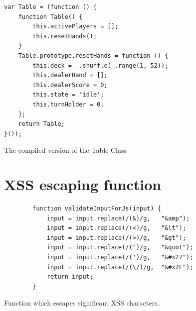 \documentclass[a4paper]{article}
\begin{document}
\begin{appendices}
\begin{listing}[H]
\begin{verbatim}
var Table = (function () {
    function Table() {
        this.activePlayers = [];
        this.resetHands();
    }
    Table.prototype.resetHands = function () {
        this.deck = _.shuffle(_.range(1, 52));
        this.dealerHand = [];
        this.dealerScore = 0;
        this.state = 'idle';
        this.turnHolder = 0;
    };
    return Table;
}());
\end{verbatim}
\caption{The compiled version of the Table Class}
\label{lst_table_compiled}
\end{listing}


\section{XSS escaping function}
\label{app_xss_escape}
\begin{listing}[H]
\begin{verbatim}
        function validateInputForJs(input) {
            input = input.replace(/(&)/g,   "&amp");
            input = input.replace(/(<)/g,   "&lt");
            input = input.replace(/(>)/g,   "&gt");
            input = input.replace(/(")/g,   "&quot");
            input = input.replace(/(')/g,   "&#x27");
            input = input.replace(/(\/)/g,  "&#x2F");
            return input;
        }
\end{verbatim}
\caption{Function which escapes significant XSS characters.}
\label{lst_xss_escape}
\end{listing}

\end{appendices}
\end{document}
